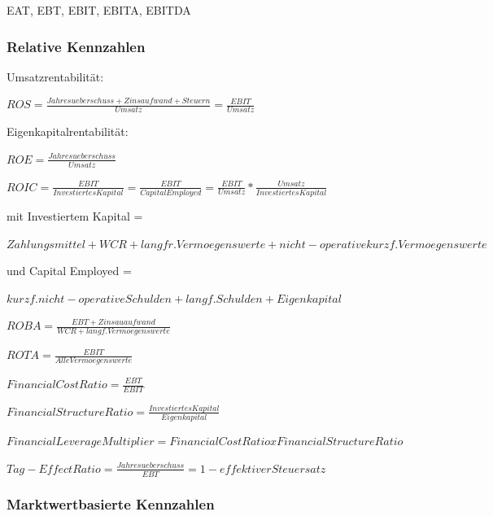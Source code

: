 \documentclass{article}
\begin{document}
EAT, EBT, EBIT, EBITA, EBITDA

\subsubsection{Relative Kennzahlen}

Umsatzrentabilität:   \begin{center}
$ ROS =  \frac{Jahresueberschuss + Zinsaufwand + Steuern}{Umsatz} = \frac{EBIT}{Umsatz} $ 
\end{center}
Eigenkapitalrentabilität:  \begin{center}
$ ROE = \frac{Jahresueberschuss}{Umsatz} $
\end{center}
\begin{center}
$ ROIC = \frac{EBIT}{Investiertes Kapital} = \frac{EBIT}{Capital Employed} = \frac{EBIT}{Umsatz}*\frac{Umsatz}{Investiertes Kapital} $
\end{center}
mit Investiertem Kapital = \begin{center}
$ Zahlungsmittel + WCR + langfr. Vermoegenswerte + nicht-operative kurzf. Vermoegenswerte$
\end{center}
und Capital Employed = \begin{center}
$ kurzf. nicht-operative Schulden + langf. Schulden + Eigenkapital $
\end{center}
\begin{center}
$ ROBA = \frac{EBT+Zinsauaufwand}{WCR+langf. Vermoegenswerte} $
\end{center}
\begin{center}
$ROTA = \frac{EBIT}{Alle Vermoegenswerte} $
\end{center}
\begin{center}
$Financial Cost Ratio = \frac{EBT}{EBIT} $
\end{center}
\begin{center}
$Financial Structure Ratio = \frac{Investiertes Kapital}{Eigenkapital} $
\end{center}
\begin{center}
$Financial Leverage Multiplier = Financial Cost Ratio x Financial Structure Ratio$
\end{center}
\begin{center}
$Tag-Effect Ratio = \frac{Jahresueberschuss}{EBT} = 1 - effektiver Steuersatz $ 
 \end{center}
\subsubsection{Marktwertbasierte Kennzahlen}
\end{document}
